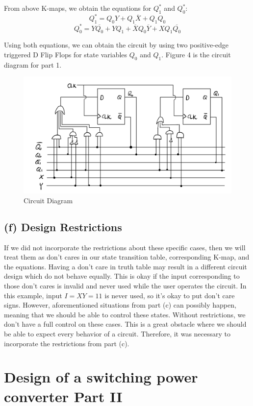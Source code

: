 \documentclass{article}
\begin{document}
From above K-maps, we obtain the equations for $Q_1^*$ and $Q_0^*$:
\begin{equation}
    Q_1^* = Q_0 Y + Q_1 \overline{X} + Q_1 Q_0
\end{equation}
\begin{equation}
    Q_0^* = Y \overline{Q_0} + Y Q_1 + \overline{X} Q_0 \overline{Y} + X Q_1 \overline{Q_0}
\end{equation}

Using both equations, we can obtain the circuit by using two positive-edge triggered D Flip Flops for state variables $Q_0$ and $Q_1$. Figure 4 is the circuit diagram for part 1.
\begin{figure}[!ht]
    \centering
    \includegraphics[width=.75\linewidth]{src/Part 1_Circuit Diagram.png}
    \caption{Circuit Diagram}
\end{figure}

\subsection*{(f) Design Restrictions}
If we did not incorporate the restrictions about these specific cases, then we will treat them as don't cares in our state transition table, corresponding K-map, and the equations. Having a don't care in truth table may result in a different circuit design which do not behave equally. This is okay if the input corresponding to those don't cares is invalid and never used while the user operates the circuit. In this example, input $I=XY=11$ is never used, so it's okay to put don't care signs. However, aforementioned situations from part (c) can possibly happen, meaning that we should be able to control these states. Without restrictions, we don't have a full control on these cases. This is a great obstacle where we should be able to expect every behavior of a circuit. Therefore, it was necessary to incorporate the restrictions from part (c).


\section*{Design of a switching power converter Part II}
\end{document}
